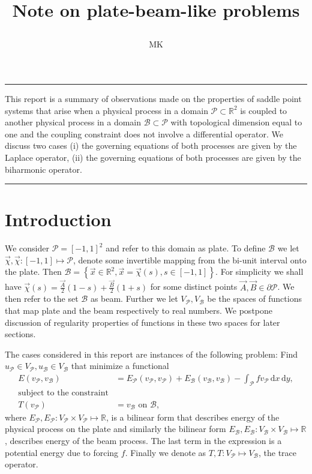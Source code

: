 \documentclass[a4paper,10pt]{article}
\newcommand{\R}{\ensuremath{\mathbb{R}}}
\newcommand{\meas}[1]{\ensuremath{\,\mathrm{d}#1}}
\newcommand{\Vp}{\ensuremath{V_{\mathcal{P}}}}
\newcommand{\Vb}{\ensuremath{V_{\mathcal{B}}}}
\newcommand{\Ep}{\ensuremath{E_{\mathcal{P}}}}
\newcommand{\Eb}{\ensuremath{E_{\mathcal{B}}}}
\newcommand{\up}{\ensuremath{u_{\mathcal{P}}}}
\newcommand{\ub}{\ensuremath{u_{\mathcal{B}}}}
\newcommand{\vp}{\ensuremath{v_{\mathcal{P}}}}
\newcommand{\vb}{\ensuremath{v_{\mathcal{B}}}}
\renewenvironment{abstract}{%
\hfill\begin{minipage}{0.95\textwidth}
\rule{\textwidth}{1pt}}
{\par\noindent\rule{\textwidth}{1pt}\end{minipage}}
\begin{document}
%
\title{\begin{center}
        Note on plate-beam-like problems
       \end{center}}
\author[1]{MK}
%
\maketitle
%
\begin{abstract}
  This report is a summary of observations made on the properties of saddle
  point systems that arise when a physical process in a domain
  $\mathcal{P}\subset\R^2$ is coupled to another physical process in a domain
  $\mathcal{B}\subset\mathcal{P}$ with topological dimension equal to one and
  the coupling constraint does not involve a differential operator. We discuss
  two cases (i) the governing equations of both processes are given by the
  Laplace operator, (ii) the governing equations of both processes are given by
  the biharmonic operator.
\end{abstract}

\section{Introduction}
  We consider $\mathcal{P}=\left[-1, 1\right]^2$ and refer to this domain as
  plate. To define $\mathcal{B}$ we let
  $\vec{\chi}, \vec{\chi}:\left[-1, 1\right]\mapsto\mathcal{P}$, denote some
  invertible mapping from the bi-unit interval onto the plate. Then
  $\mathcal{B}=\left\{\vec{x}\in\R^2, \vec{x}=\vec{\chi}(s), s\in\left[-1,
  1\right]\right\}$. For simplicity we shall have
  $\vec{\chi}(s)=\frac{\vec{A}}{2}(1-s) +\frac{\vec{B}}{2}(1+s)$ for some
  distinct points $\vec{A}, \vec{B}\in\partial\mathcal{P}$. We then refer to
  the set $\mathcal{B}$ as beam. Further we let $V_{\mathcal{P}}, V_{\mathcal{B}}$
  be the spaces of functions that map plate and the beam respectively to real
  numbers. We postpone discussion of regularity properties of functions in these
  two spaces for later sections.

  The cases considered in this report are instances of the following
  problem: Find $\up\in\Vp, \ub\in\Vb$ that minimize a functional
  \begin{equation}
    \label{eq:energy}
    \begin{aligned}
      E(\vp, \vb) &= \Ep(\vp, \vp) + \Eb(\vb, \vb) - \int_{\mathcal{P}}f \vp \meas{x}\meas{y}, \\
      \text{subject to the constraint}&\\
      T(\vp) &= \vb\text{ on }\mathcal{B},
    \end{aligned}
  \end{equation}
  where $\Ep, \Ep: \Vp\times\Vp\mapsto\R$, is a bilinear form that describes
  energy of the physical process on the plate and similarly the bilinear form
  $\Eb, \Eb:\Vb\times\Vb\mapsto\R$, describes energy of the beam process. The
  last term in the expression is a potential energy due to forcing $f$. Finally
  we denote as $T, T:\Vp\mapsto\Vb$, the trace operator.
  
\end{document}
